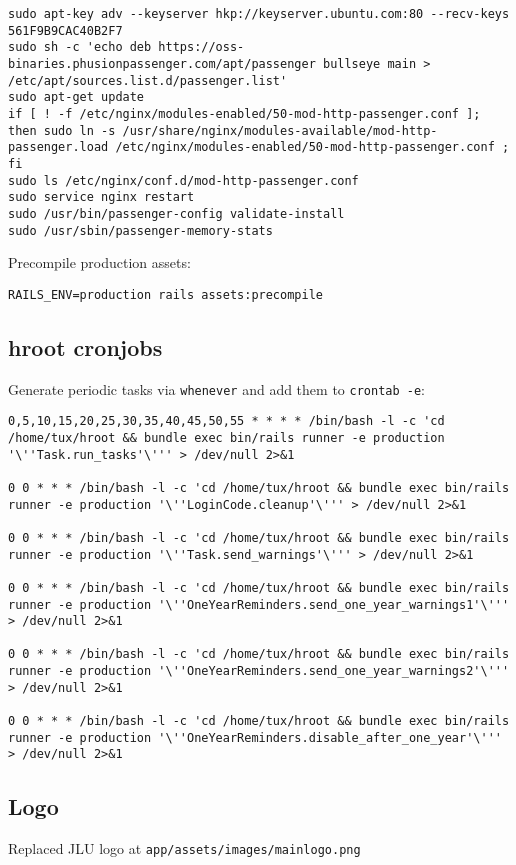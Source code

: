 \documentclass{article}
\begin{document}
\begin{lstlisting}
sudo apt-key adv --keyserver hkp://keyserver.ubuntu.com:80 --recv-keys 561F9B9CAC40B2F7
sudo sh -c 'echo deb https://oss-binaries.phusionpassenger.com/apt/passenger bullseye main > /etc/apt/sources.list.d/passenger.list'
sudo apt-get update
if [ ! -f /etc/nginx/modules-enabled/50-mod-http-passenger.conf ]; then sudo ln -s /usr/share/nginx/modules-available/mod-http-passenger.load /etc/nginx/modules-enabled/50-mod-http-passenger.conf ; fi
sudo ls /etc/nginx/conf.d/mod-http-passenger.conf
sudo service nginx restart
sudo /usr/bin/passenger-config validate-install
sudo /usr/sbin/passenger-memory-stats
\end{lstlisting}

Precompile production assets:
\begin{lstlisting}
RAILS_ENV=production rails assets:precompile
\end{lstlisting}

\subsection{hroot cronjobs}
Generate periodic tasks via \verb|whenever| and add them to \verb|crontab -e|:
\begin{lstlisting}
0,5,10,15,20,25,30,35,40,45,50,55 * * * * /bin/bash -l -c 'cd /home/tux/hroot && bundle exec bin/rails runner -e production '\''Task.run_tasks'\''' > /dev/null 2>&1

0 0 * * * /bin/bash -l -c 'cd /home/tux/hroot && bundle exec bin/rails runner -e production '\''LoginCode.cleanup'\''' > /dev/null 2>&1

0 0 * * * /bin/bash -l -c 'cd /home/tux/hroot && bundle exec bin/rails runner -e production '\''Task.send_warnings'\''' > /dev/null 2>&1

0 0 * * * /bin/bash -l -c 'cd /home/tux/hroot && bundle exec bin/rails runner -e production '\''OneYearReminders.send_one_year_warnings1'\''' > /dev/null 2>&1

0 0 * * * /bin/bash -l -c 'cd /home/tux/hroot && bundle exec bin/rails runner -e production '\''OneYearReminders.send_one_year_warnings2'\''' > /dev/null 2>&1

0 0 * * * /bin/bash -l -c 'cd /home/tux/hroot && bundle exec bin/rails runner -e production '\''OneYearReminders.disable_after_one_year'\''' > /dev/null 2>&1
\end{lstlisting}

\subsection{Logo}
Replaced JLU logo at \verb|app/assets/images/mainlogo.png|
\end{document}
